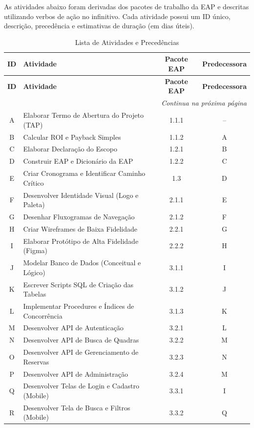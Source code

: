 \documentclass[12pt,a4paper,oneside]{report}
\begin{document}
As atividades abaixo foram derivadas dos pacotes de trabalho da EAP e descritas utilizando verbos de ação no infinitivo. Cada atividade possui um ID único, descrição, precedência e estimativas de duração (em dias úteis).

\begin{longtable}{c p{6cm} c c}
\caption{Lista de Atividades e Precedências} \\
\toprule
\textbf{ID} & \textbf{Atividade} & \textbf{Pacote EAP} & \textbf{Predecessora} \\
\midrule
\endfirsthead
\toprule
\textbf{ID} & \textbf{Atividade} & \textbf{Pacote EAP} & \textbf{Predecessora} \\
\midrule
\endhead
\midrule
\multicolumn{4}{r}{\textit{Continua na próxima página}} \\
\endfoot
\bottomrule
\endlastfoot
A & Elaborar Termo de Abertura do Projeto (TAP) & 1.1.1 & -- \\
B & Calcular ROI e Payback Simples & 1.1.2 & A \\
C & Elaborar Declaração do Escopo & 1.2.1 & B \\
D & Construir EAP e Dicionário da EAP & 1.2.2 & C \\
E & Criar Cronograma e Identificar Caminho Crítico & 1.3 & D \\
F & Desenvolver Identidade Visual (Logo e Paleta) & 2.1.1 & E \\
G & Desenhar Fluxogramas de Navegação & 2.1.2 & F \\
H & Criar Wireframes de Baixa Fidelidade & 2.2.1 & G \\
I & Elaborar Protótipo de Alta Fidelidade (Figma) & 2.2.2 & H \\
J & Modelar Banco de Dados (Conceitual e Lógico) & 3.1.1 & I \\
K & Escrever Scripts SQL de Criação das Tabelas & 3.1.2 & J \\
L & Implementar Procedures e Índices de Concorrência & 3.1.3 & K \\
M & Desenvolver API de Autenticação & 3.2.1 & L \\
N & Desenvolver API de Busca de Quadras & 3.2.2 & M \\
O & Desenvolver API de Gerenciamento de Reservas & 3.2.3 & N \\
P & Desenvolver API de Administração & 3.2.4 & M \\
Q & Desenvolver Telas de Login e Cadastro (Mobile) & 3.3.1 & I \\
R & Desenvolver Tela de Busca e Filtros (Mobile) & 3.3.2 & Q \\

\end{longtable}
\end{document}
